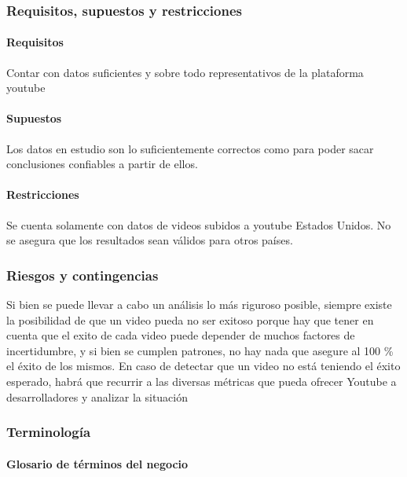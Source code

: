     \subsubsection{Requisitos, supuestos y restricciones}
        \paragraph{Requisitos}
        Contar con datos suficientes y sobre todo representativos de la
        plataforma youtube
        \paragraph{Supuestos}
        Los datos en estudio son lo suficientemente correctos como para poder
        sacar conclusiones confiables a partir de ellos.
        \paragraph{Restricciones}
        Se cuenta solamente con datos de videos subidos a youtube
        Estados Unidos. No se asegura que los resultados sean válidos para
        otros países.

    \subsubsection{Riesgos y contingencias}

        Si bien se puede llevar a cabo un análisis lo más riguroso posible, siempre existe la
        posibilidad de que un video pueda no ser exitoso porque hay que tener en
        cuenta que el exito de cada video puede depender de muchos factores de
        incertidumbre, y si bien se cumplen patrones, no hay nada que asegure al
        100 \% el éxito de los mismos.
        En caso de detectar que un video no está teniendo el éxito esperado,
        habrá que recurrir a las diversas métricas que pueda ofrecer Youtube a
        desarrolladores y analizar la situación

    \subsubsection{Terminología}

        \paragraph{Glosario de términos del negocio}

